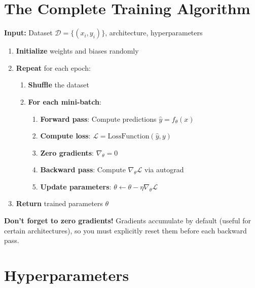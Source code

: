 \section{The Complete Training Algorithm}

\begin{algorithm}
\textbf{Input:} Dataset $\mathcal{D} = \{(x_i, y_i)\}$, architecture, hyperparameters

\begin{enumerate}
    \item \textbf{Initialize} weights and biases randomly
    \item \textbf{Repeat} for each epoch:
    \begin{enumerate}
        \item \textbf{Shuffle} the dataset
        \item \textbf{For each mini-batch}:
        \begin{enumerate}
            \item \textbf{Forward pass}: Compute predictions $\hat{y} = f_\theta(x)$
            \item \textbf{Compute loss}: $\mathcal{L} = \text{LossFunction}(\hat{y}, y)$
            \item \textbf{Zero gradients}: $\nabla_\theta = 0$
            \item \textbf{Backward pass}: Compute $\nabla_\theta \mathcal{L}$ via autograd
            \item \textbf{Update parameters}: $\theta \leftarrow \theta - \eta \nabla_\theta \mathcal{L}$
        \end{enumerate}
    \end{enumerate}
    \item \textbf{Return} trained parameters $\theta$
\end{enumerate}
\end{algorithm}

\begin{important}
\textbf{Don't forget to zero gradients!} Gradients accumulate by default (useful for certain architectures), so you must explicitly reset them before each backward pass.
\end{important}

\section{Hyperparameters}


